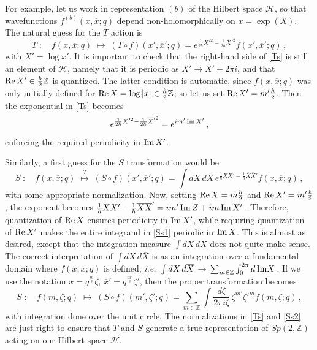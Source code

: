 \documentclass[11pt,letterpaper]{article}
\numberwithin{equation}{section}
\newcommand{\be}{\begin{equation}}
\newcommand{\ee}{\end{equation}}
\newcommand{\ol}{\overline}
\newcommand{\ie}{\emph{i.e.}}
\newcommand{\Z}{{\mathbb Z}}
\renewcommand{\Re}{{\rm Re}}
\renewcommand{\Im}{{\rm Im}}
\newcommand{\CH}{\mathcal{H}}
\begin{document}
For example, let us work in representation $(b)$ of the Hilbert space $\CH$, so that wavefunctions $f^{(b)}(x,\ol x;q)$ depend non-holomorphically on $x=\exp(X)$. The natural guess for the $T$ action is
%
\be T\;:\quad f(x,\ol x;q)\;\mapsto\; (T\circ f)(x',\ol x';q) = e^{\frac{1}{2\hbar}X'^2-\frac{1}{2\hbar}\ol X'^2}f(x',\ol x';q)\,, \label{Ts}\ee
%
with $X'=\log x'$.
It is important to check that the right-hand side of \eqref{Ts} is still an element of $\CH$, namely that it is periodic as $X'\to X'+2\pi i$, and that $\Re \,X' \in \tfrac\hbar2\Z$ is quantized. The latter condition is automatic, since $f(x,\ol x;q)$ was only initially defined for $\Re \,X = \log |x| \in \tfrac\hbar2\Z$; so let us set $\Re \,X' = m'\tfrac\hbar 2$. Then the exponential in \eqref{Ts} becomes
%
\be e^{\frac{1}{2\hbar}X'^2-\frac{1}{2\hbar}\ol X'^2} = e^{im'\,\Im\,X'}\,, \ee
%
enforcing the required periodicity in $\Im\, X'$.

Similarly, a first guess for the $S$ transformation would be
%
\be S\;:\quad f(x,\ol x;q)\;\overset{?}{\mapsto}\; (S\circ f)(x',\ol x';q)=\int dX\,d\ol X\,e^{\frac1\hbar XX'-\frac1\hbar \ol X\ol X'}f(x,\ol x;q)\,, \label{Ss1}\ee
%
with some appropriate normalization.
Now, setting $\Re\,X = m\tfrac\hbar2$ and $\Re\,X'=m'\tfrac\hbar2$, the exponent becomes $\tfrac1\hbar XX'-\tfrac1\hbar \ol X\ol X'=im'\,\Im\,Z+im\,\Im\,X'$\,. Therefore, quantization of $\Re\,X$ ensures periodicity in $\Im\,X'$, while requiring quantization of $\Re\,X'$ makes the entire integrand in \eqref{Ss1} periodic in $\Im\,X$. This is almost as desired, except that the integration measure $\int dX\,d\ol X$ does not quite make sense. The correct interpretation of $\int dX\,d\ol X$ is as an integration over a fundamental domain where $f(x,\ol x;q)$ is defined, \ie\ $\int dX\,d\ol X \,\to\, \sum_{m\in \Z}\int_0^{2\pi} d\,\Im X$\,. If we use the notation $x = q^{\frac m2}\zeta,\,\ol x'=q^{\frac {m'}2}\zeta'$, then the proper transformation becomes
%
\be S\;:\quad f(m,\zeta;q)\;\mapsto\; (S\circ f)(m',\zeta';q) = \sum_{m\in \Z} \int \frac{d\zeta}{2\pi i\zeta}\,\zeta^{m'}{\zeta'}^mf(m,\zeta;q)\,, \label{Ss2}\ee
%
with integration done over the unit circle. The normalizations in \eqref{Ts} and \eqref{Ss2} are just right to ensure that $T$ and $S$ generate a true representation of $Sp(2,\Z)$ acting on our Hilbert space $\CH$.
\end{document}
